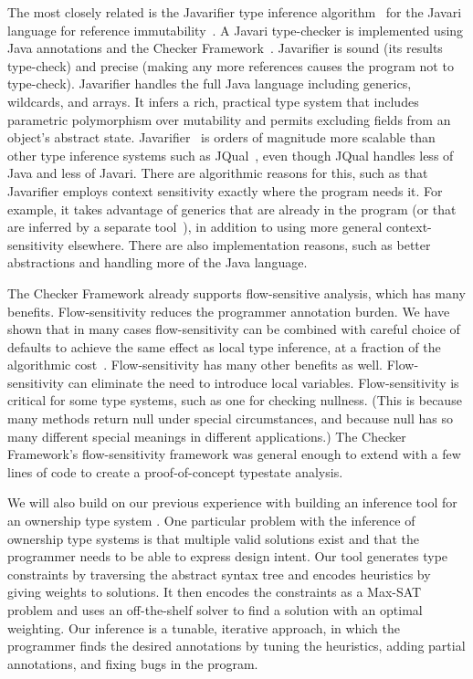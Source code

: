 \documentclass{sig-alternate}
\newcommand{\codeid}[1]{\ifmmode{\mbox{\ttfamily{#1}}}\else{\ttfamily #1}\fi}
\begin{document}
The most closely related is the Javarifier type inference
algorithm~\cite{Tschantz2006,QuinonezTE2008} for the Javari language for
reference immutability~\cite{BirkaE2004,TschantzE2005}.  A Javari
type-checker is implemented using Java annotations and the Checker
Framework~\cite{PapiACPE2008}.  Javarifier is sound (its results
type-check) and precise (making any more references \codeid{@Readonly} causes
the program not to type-check).  Javarifier handles the full Java language
including generics, wildcards, and arrays.  It infers a rich, practical
type system that includes parametric polymorphism over mutability and
permits excluding fields from an object's abstract state.
Javarifier~\cite{Tschantz2006} is orders of magnitude more scalable than
other type inference systems such as JQual~\cite{GreenfieldboyceF2007},
even though JQual handles less of Java and less of Javari.  There are
algorithmic reasons for this, such as that Javarifier employs context
sensitivity exactly where the program needs it.  For example, it takes
advantage of generics that are already in the program (or that are inferred
by a separate tool~\cite{DonovanKTE2004,KiezunETF2007}), in addition to
using more general context-sensitivity elsewhere.  There are also
implementation reasons, such as better abstractions and handling more of
the Java language.

The Checker Framework already supports flow-sensitive analysis, which has
many benefits.
%
Flow-sensitivity reduces the programmer annotation burden.  We have shown
that in many cases flow-sensitivity can be combined with careful choice of
defaults to achieve the same effect as local type inference, at a fraction
of the algorithmic cost~\cite{PapiACPE2008}.
%
Flow-sensitivity has many other benefits as well.
%
Flow-sensitivity can eliminate the need to introduce local variables.
%
Flow-sensitivity
is critical for some type systems, such as one for checking nullness.
(This is because many methods return null under special circumstances, and
because null has so many different special meanings in different
applications.)
%
The Checker Framework's flow-sensitivity framework was general enough to
extend with a few lines of code to create a proof-of-concept typestate
analysis.

We will also build on our previous experience \cite{DietlEM2011} with
building an inference tool for an ownership type system
\cite{DietlPhD09}.
One particular problem with the inference of ownership type systems is
that multiple valid solutions exist and that the programmer needs to
be able to express design intent.
Our tool generates type constraints by traversing the abstract syntax
tree and encodes heuristics by giving weights to solutions.
It then encodes the constraints as a Max-SAT problem and uses an
off-the-shelf solver to find a solution with an optimal weighting.
Our inference is a tunable, iterative approach, in which the
programmer finds the desired annotations by tuning the heuristics,
adding partial annotations, and fixing bugs in the program.
\end{document}
